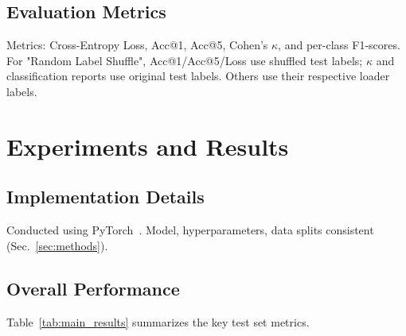 \documentclass[10pt,twocolumn,letterpaper]{article}
\begin{document}
\subsection{Evaluation Metrics}
Metrics: Cross-Entropy Loss, Acc@1, Acc@5, Cohen's $\kappa$, and per-class F1-scores.
For "Random Label Shuffle", Acc@1/Acc@5/Loss use shuffled test labels; $\kappa$ and classification reports use original test labels. Others use their respective loader labels.

\section{Experiments and Results} %
\label{sec:experiments_results}

\subsection{Implementation Details}
Conducted using PyTorch~\cite{DBLP:conf/nips/PaszkeGMLBCKLGA19}. Model, hyperparameters, data splits consistent (Sec.~\ref{sec:methods}).

\subsection{Overall Performance}
Table~\ref{tab:main_results} summarizes the key test set metrics.

\begin{table*}[htbp!] %
    \centering
    \caption{Test set performance. "Loss", "Acc@1", "Acc@5" are on loader labels. "Cohen's $\kappa$" for "Shuffle" is vs. original labels. Best Acc@1, Acc@5, $\kappa$ bolded; lowest Loss (excl. Shuffle) bolded.}
    \label{tab:main_results}
\end{table*}
\end{document}
